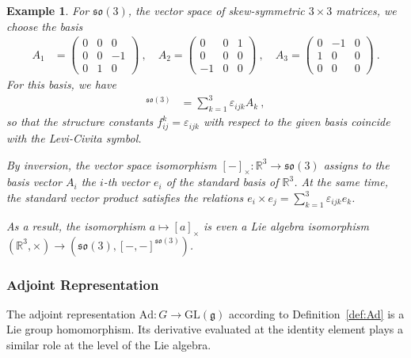 \documentclass[10pt,a4paper]{article}
\theoremstyle{mytheorem}
\theoremstyle{mydefinition}
\newtheorem{example}[theorem]{Example}
\newcommand{\Ad}{\mathrm{Ad}}
\newcommand{\fso}{\mathfrak{so}}
\begin{document}
\begin{example}
\label{ex:so3base}
For $\fso(3)$, the vector space of skew-symmetric $3\times 3$ matrices, we choose the basis
\begin{align*}
A_1 &=
\begin{pmatrix}
0 & 0 & 0 \\
0 & 0 & -1 \\
0 & 1 & 0
\end{pmatrix}
\ ,\quad
A_2 =
\begin{pmatrix}
0 & 0 & 1 \\
0 & 0 & 0 \\
-1& 0 & 0
\end{pmatrix}
\ ,\quad
A_3 =
\begin{pmatrix}
0 & -1 & 0 \\
1 & 0 & 0 \\
0 & 0 & 0
\end{pmatrix}
\ .
\end{align*}
For this basis, we have
\begin{align*}
[A_i,A_j]^{\fso(3)} &= \sum_{k=1}^3 \varepsilon_{ijk} A_k
\ ,
\end{align*}
so that the structure constants $f^k_{ij}=\varepsilon_{ijk}$ with respect to the given basis coincide with the Levi-Civita symbol.

By inversion, the vector space isomorphism $[-]_\times:\mathbb{R}^3\rightarrow\fso(3)$ assigns to the basis vector $A_i$ the $i$-th vector $e_i$ of the standard basis of $\mathbb{R}^3$.
At the same time, the standard vector product satisfies the relations $e_i\times e_j=\sum_{k=1}^3 \varepsilon_{ijk}e_k$.

As a result, the isomorphism $a\mapsto[a]_\times$ is even a Lie algebra isomorphism $(\mathbb{R}^3,\times)\rightarrow(\fso(3), [-,-]^{\fso(3)})$.
\end{example}

\subsubsection{Adjoint Representation}

The adjoint representation $\Ad:G\rightarrow\mathrm{GL}(\mathfrak{g})$ according to Definition~\ref{def:Ad} is a Lie group homomorphism.
Its derivative evaluated at the identity element plays a similar role at the level of the Lie algebra.
\end{document}
